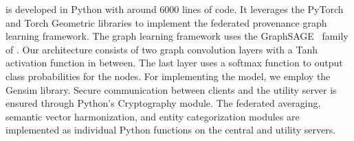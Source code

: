  \Sys is developed in Python with around 6000 lines of code. It leverages the PyTorch and Torch Geometric libraries to implement the federated provenance graph learning framework. The graph learning framework uses the GraphSAGE~\cite{hamilton2017inductive} family of \gnnshort. Our architecture consists of two graph convolution layers with a Tanh activation function in between. The last layer uses a softmax function to output class probabilities for the nodes. For implementing the \wordvec model, we employ the Gensim library. Secure communication between clients and the utility server is ensured through Python's Cryptography module. The federated averaging, semantic vector harmonization, and entity categorization modules are implemented as individual Python functions on the central and utility servers.




